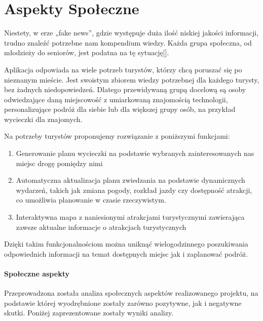 

\section{Aspekty Społeczne}
\label{subsec:aspekty-spoleczne}



\par Niestety, w erze „fake news”, gdzie występuje duża ilość niskiej jakości informacji, trudno znaleźć potrzebne nam kompendium wiedzy. Każda grupa społeczna, od młodzieży do seniorów, jest podatna na tę sytuację[].

\indent Aplikacja odpowiada na wiele potrzeb turystów, którzy chcą poruszać się po nieznanym mieście. Jest swoistym zbiorem wiedzy potrzebnej dla każdego turysty, bez żadnych niedopowiedzeń. Dlatego przewidywaną grupą docelową są osoby odwiedzające daną miejscowość z umiarkowaną znajomością technologii, personalizujące podróż dla siebie lub dla większej grupy osób, na przykład wycieczki dla znajomych.



\indent Na potrzeby turystów proponujemy rozwiązanie z poniższymi funkcjami:

\begin{enumerate}
   \item 	Generowanie planu wycieczki na podstawie wybranych zainteresowanych nas miejsc drogę pomiędzy nimi
   \item 	Automatyczna aktualizacja planu zwiedzania na podstawie dynamicznych wydarzeń, takich jak zmiana pogody, rozkład jazdy czy dostępność atrakcji, co umożliwia planowanie w czasie rzeczywistym.
   \item	Interaktywna mapa z naniesionymi atrakcjami turystycznymi zawierająca zawsze aktualne informacje o atrakcjach turystycznych
\end{enumerate}

\indent Dzięki takim funkcjonalnościom można uniknąć wielogodzinnego poszukiwania odpowiednich informacji na temat dostępnych miejsc jak i zaplanować podróż.

\paragraph*{Społeczne aspekty}

\indent Przeprowadzona została analiza społecznych aspektów realizowanego projektu, na podstawie której wyodrębnione zostały zarówno pozytywne, jak i negatywne skutki.  Poniżej zaprezentowane zostały wyniki analizy.

